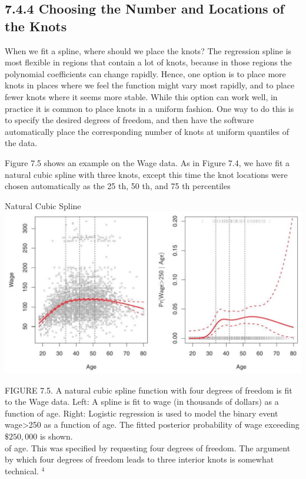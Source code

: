 \documentclass[10pt]{article}
\begin{document}
\subsection*{7.4.4 Choosing the Number and Locations of the Knots}
When we fit a spline, where should we place the knots? The regression spline is most flexible in regions that contain a lot of knots, because in those regions the polynomial coefficients can change rapidly. Hence, one option is to place more knots in places where we feel the function might vary most rapidly, and to place fewer knots where it seems more stable. While this option can work well, in practice it is common to place knots in a uniform fashion. One way to do this is to specify the desired degrees of freedom, and then have the software automatically place the corresponding number of knots at uniform quantiles of the data.

Figure 7.5 shows an example on the Wage data. As in Figure 7.4, we have fit a natural cubic spline with three knots, except this time the knot locations were chosen automatically as the 25 th, 50 th, and 75 th percentiles

Natural Cubic Spline\\
\includegraphics[max width=\textwidth, center]{2025_05_05_efe77898333945044de4g-290}

FIGURE 7.5. A natural cubic spline function with four degrees of freedom is fit to the Wage data. Left: A spline is fit to wage (in thousands of dollars) as a function of age. Right: Logistic regression is used to model the binary event wage>250 as a function of age. The fitted posterior probability of wage exceeding $\$ 250,000$ is shown.\\
of age. This was specified by requesting four degrees of freedom. The argument by which four degrees of freedom leads to three interior knots is somewhat technical. ${ }^{4}$
\end{document}
